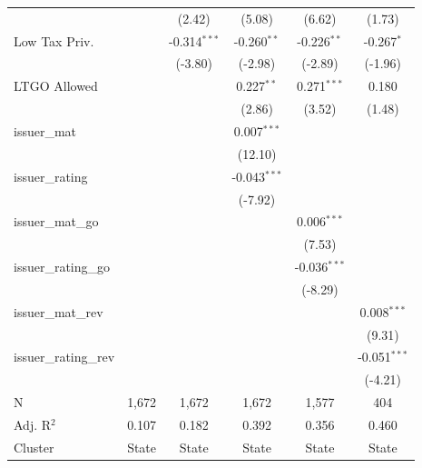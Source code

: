 \begin{tabular*}{\textwidth}{@{\extracolsep{\fill}}lccccc}
                              &               & (2.42)        & (5.08)        & (6.62)        & (1.73)\\   
   Low Tax Priv.              &               & -0.314$^{***}$ & -0.260$^{**}$  & -0.226$^{**}$  & -0.267$^{*}$\\   
                              &               & (-3.80)       & (-2.98)       & (-2.89)       & (-1.96)\\   
   LTGO Allowed               &               &                & 0.227$^{**}$   & 0.271$^{***}$  & 0.180\\   
                              &               &                & (2.86)        & (3.52)        & (1.48)\\   
   issuer\_mat                &               &                & 0.007$^{***}$  &                &   \\   
                              &               &                & (12.10)       &                &   \\   
   issuer\_rating             &               &                & -0.043$^{***}$ &                &   \\   
                              &               &                & (-7.92)       &                &   \\   
   issuer\_mat\_go            &               &                &                & 0.006$^{***}$  &   \\   
                              &               &                &                & (7.53)        &   \\   
   issuer\_rating\_go         &               &                &                & -0.036$^{***}$ &   \\   
                              &               &                &                & (-8.29)       &   \\   
   issuer\_mat\_rev           &               &                &                &                & 0.008$^{***}$\\   
                              &               &                &                &                & (9.31)\\   
   issuer\_rating\_rev        &               &                &                &                & -0.051$^{***}$\\   
                              &               &                &                &                & (-4.21)\\   
   \hline
   N               & 1,672         & 1,672          & 1,672          & 1,577          & 404\\  
   Adj. R$^2$             & 0.107         & 0.182          & 0.392          & 0.356          & 0.460\\  
   Cluster              & State & State & State & State & State\\  
   \bottomrule
\end{tabular*}
\par\endgroup

